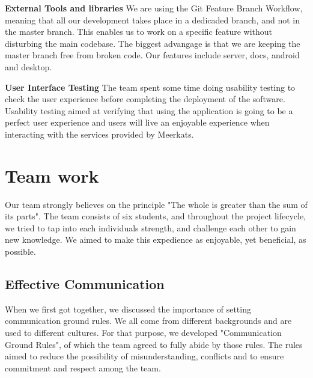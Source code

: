 \documentclass{article}
\begin{document}
\textbf{External Tools and libraries}
We are using the Git Feature Branch Workflow, meaning that all our development takes place in a dedicaded branch, and not in the master branch. This enables us to work on a specific feature without disturbing the main codebase. The biggest advangage is that we are keeping the master branch free from broken code. Our features include server, docs, android and desktop.

\textbf{User Interface Testing}
The team spent some time doing usability testing to check the user experience before completing the deployment of the software. Usability testing aimed at verifying that using the application is going to be a perfect user experience and users will live an enjoyable experience when interacting with the services provided by Meerkats.


\section{Team work}
Our team strongly believes on the principle "The whole is greater than the sum of its parts". The team consists of six students, and throughout the project lifecycle, we tried to tap into each individuals strength, and challenge each other to gain new knowledge. We aimed to make this expedience as enjoyable, yet beneficial, as possible.

\subsection{Effective Communication}
When we first got together, we discussed the importance of setting communication ground rules. We all come from different backgrounds and are used to different cultures. For that purpose, we developed "Communication Ground Rules", of which the team agreed to fully abide by those rules. The rules aimed to reduce the possibility of misunderstanding, conflicts and to ensure commitment and respect among the team.
\end{document}
